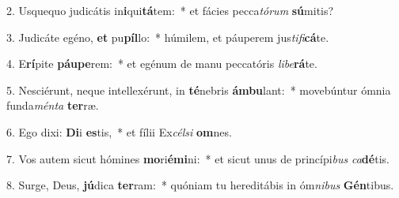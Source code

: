 2. Usquequo judicátis in\textbf{i}qui\textbf{tá}tem:~*  et fácies pecca\textit{tó}\textit{rum} \textbf{sú}mitis?\

3. Judicáte egéno, \textbf{et} pu\textbf{píl}lo:~*  húmilem, et páuperem jus\textit{ti}\textit{fi}\textbf{cá}te.\

4. E\textbf{rí}pite \textbf{páu}\textbf{pe}rem:~*  et egénum de manu peccatóris \textit{li}\textit{be}\textbf{rá}te.\

5. Nesciérunt, neque intellexérunt, in \textbf{té}nebris \textbf{ám}\textbf{bu}lant:~*  movebúntur ómnia funda\textit{mén}\textit{ta} \textbf{ter}ræ.\

6. Ego dixi: \textbf{Di}i \textbf{es}tis,~*  et fílii Ex\textit{cél}\textit{si} \textbf{om}nes.\

7. Vos autem sicut hómines \textbf{mo}ri\textbf{é}\textbf{mi}ni:~*  et sicut unus de princípi\textit{bus} \textit{ca}\textbf{dé}tis.\

8. Surge, Deus, \textbf{jú}dica \textbf{ter}ram:~*  quóniam tu hereditábis in óm\textit{ni}\textit{bus} \textbf{Gén}tibus.\

